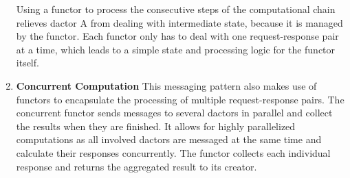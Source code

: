\begin{enumerate}
        Using a \gls{functor} to process the consecutive steps of the computational chain relieves \gls{dactor} A from dealing with intermediate state, because it is managed by the \gls{functor}.
        Each \gls{functor} only has to deal with one request-response pair at a time, which leads to a simple state and processing logic for the \gls{functor} itself.

      \item\label{enum:comp_pattern_3} \textbf{Concurrent Computation}
        This messaging pattern also makes use of \glspl{functor} to encapsulate the processing of multiple request-response pairs.
        The concurrent \gls{functor} sends messages to several \glspl{dactor} in parallel and collect the results when they are finished.
        It allows for highly parallelized computations as all involved \glspl{dactor} are messaged at the same time and calculate their responses concurrently.
        The \gls{functor} collects each individual response and returns the aggregated result to its creator.
    \end{enumerate}
